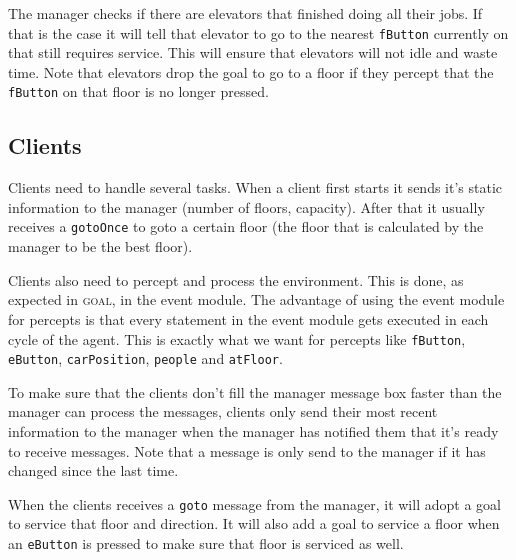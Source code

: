 \documentclass[a4paper,10pt,twocolumn]{article}
\begin{document}
The manager checks if there are elevators that finished doing all their jobs. If that is the case it will tell that elevator to go to the nearest \texttt{fButton} currently on that still requires service. This will ensure that elevators will not idle and waste time. Note that elevators drop the goal to go to a floor if they percept that the \texttt{fButton} on that floor is no longer pressed.

\subsection{Clients}
Clients need to handle several tasks. When a client first starts it sends it's static information to the manager (number of floors, capacity). After that it usually receives a \texttt{gotoOnce} to goto a certain floor (the floor that is calculated by the manager to be the best floor).

Clients also need to percept and process the environment. This is done, as expected in \textsc{goal}, in the event module. The advantage of using the event module for percepts is that every statement in the event module gets executed in each cycle of the agent. This is exactly what we want for percepts like \texttt{fButton}, \texttt{eButton}, \texttt{carPosition}, \texttt{people} and \texttt{atFloor}. 

To make sure that the clients don't fill the manager message box faster than the manager can process the messages, clients only send their most recent information to the manager when the manager has notified them that it's ready to receive messages. Note that a message is only send to the manager if it has changed since the last time.

When the clients receives a \texttt{goto} message from the manager, it will adopt a goal to service that floor and direction. It will also add a goal to service a floor when an \texttt{eButton} is pressed to make sure that floor is serviced as well.
\end{document}
